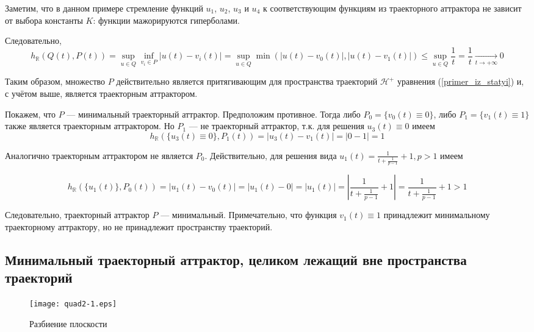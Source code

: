 Заметим, что в данном примере стремление функций $u_1$, $u_2$, $u_3$ и $u_4$ к соответствующим функциям из траекторного аттрактора не зависит от выбора константы $K$: функции мажорируются гиперболами.

Следовательно,
$$
	h_{\mathbb{R}}(Q(t),P(t)) =
	\sup_{u\in Q} \inf_{v_i \in P} |u(t) - v_i(t)| =
	\sup_{u\in Q} \min(|u(t) - v_0(t)|,|u(t) - v_1(t)|) \leq
	\sup_{u\in Q} \frac{1}{t} =
	\frac{1}{t}
	\xrightarrow[t\to+\infty]{}0
$$

Таким образом, множество $P$ действительно является притягивающим для пространства траекторий $\mathcal{H}^+$ уравнения (\ref{primer_iz_statyi}) и, с учётом выше, является траекторным аттрактором.

Покажем, что $P$ --- минимальный траекторный аттрактор.
Предположим противное.
Тогда либо $P_0 =\{v_0(t) \equiv 0\}$, либо $P_1 =\{v_1(t) \equiv 1\}$ также является траекторным аттрактором.
Но $P_1$ --- не траекторный аттрактор, т.к. для решения $u_3(t) \equiv 0$ имеем
\begin{equation}
	h_{\mathbb{R}}(\{u_3(t) \equiv 0 \},P_1(t)) =
	|u_3(t) - v_1(t)| =
	|0-1| =
	1
\end{equation}

Аналогично траекторным аттрактором не является $P_0$.
Действительно, для решения вида $u_1(t)=\frac{1}{t+\frac{1}{p-1}}+1, p > 1$ имеем

\begin{equation}
	h_{\mathbb{R}}(\{u_1(t)\},P_0(t)) =
	|u_1(t) - v_0(t)| =
	|u_1(t) - 0| =
	|u_1(t)| =
	\left| \frac{1}{t+\frac{1}{p-1}}+1 \right| =
	\frac{1}{t+\frac{1}{p-1}}+1 >	1
\end{equation}

Следовательно, траекторный аттрактор $P$ --- минимальный.
Примечательно, что функция $v_1(t) \equiv 1$ принадлежит минимальному траекторному аттрактору,
но не принадлежит пространству траекторий.


\newpage
\subsection*{Минимальный траекторный аттрактор, целиком лежащий вне пространства траекторий}

\begin{wrapfigure}[24]{r}{6cm}
	\texttt{[image: quad2-1.eps]}
	\caption{Разбиение плоскости}
	\label{fig:somelabel}
\end{wrapfigure}

